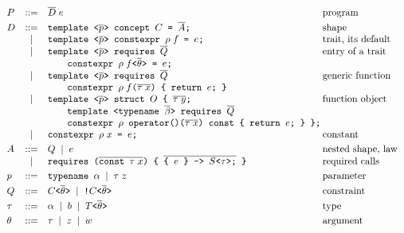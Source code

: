 \begin{figure}[!htb]
\[
\begin{array}{lcl@{\hspace{0.2em}}l}
P &::=& \overline{D}\; e & \text{program} \\[3pt]
D &::=& \texttt{template <}\overline{p}\texttt{> concept } C \texttt{ = } \overline{A}\texttt{;} & \text{shape} \\
  & \mid & \texttt{template <}\overline{p}\texttt{> constexpr } \rho\; f \texttt{ = } e\texttt{;} & \text{trait, its default} \\
  & \mid & \texttt{template <}\overline{p}\texttt{> requires } \overline{Q} & \text{entry of a trait} \\
  &   & \qquad \texttt{constexpr } \rho\; f\texttt{<}\overline{\theta}\texttt{>} \texttt{ = } e\texttt{;} & \\
  & \mid & \texttt{template <}\overline{p}\texttt{> requires } \overline{Q} & \text{generic function} \\
  &   & \qquad \texttt{constexpr } \rho\; f\texttt{(}\overline{\tau\; x}\texttt{) \{ return } e\texttt{; \}} & \\
  & \mid & \texttt{template <}\overline{p}\texttt{> struct } O \texttt{ \{ } \overline{\tau\; y}\texttt{;} & \text{function object} \\
  &   & \qquad \texttt{template <typename }\overline{\beta}\texttt{> requires } \overline{Q} & \\
  &   & \qquad \texttt{constexpr } \rho \texttt{ operator()(}\overline{\tau\; x}\texttt{) const \{ return } e\texttt{; \} \};} & \\
  & \mid & \texttt{constexpr } \rho\; x \texttt{ = } e\texttt{;} & \text{constant} \\[3pt]
A &::=& Q \;\mid\; e & \text{nested shape, law} \\
  & \mid & \texttt{requires (}\overline{\texttt{const }\tau\; x}\texttt{) \{ } \overline{\texttt{\{ }e\texttt{ \} -> }S\texttt{<}\tau\texttt{>;}} \texttt{ \}} & \text{required calls} \\[3pt]
p &::=& \texttt{typename } \alpha \;\mid\; \tau\; z & \text{parameter} \\[3pt]
Q &::=& C\texttt{<}\overline{\theta}\texttt{>} \;\mid\; \texttt{!}C\texttt{<}\overline{\theta}\texttt{>} & \text{constraint} \\[3pt]
\tau &::=& \alpha \;\mid\; b \;\mid\; T\texttt{<}\overline{\theta}\texttt{>} & \text{type} \\[3pt]
\theta &::=& \tau \;\mid\; z \;\mid\; w & \text{argument} \\[3pt]

\end{array}\]
\end{figure}
